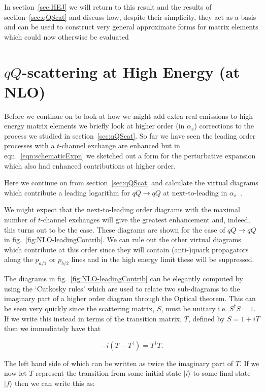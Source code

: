		In section~\ref{sec:HEJ} we will return to this result and the results of section~\ref{sec:qQScat} and discuss how,
		despite their simplicity, they act as a basis and can be used to construct very general approximate forms for matrix elements which
		could now otherwise be evaluated

\section{$qQ$-scattering at High Energy (at NLO)}
	\label{sub:HE22_NLO}

	Before we continue on to look at how we might add extra real emissions to high energy matrix
	elements we briefly look at higher order (in $\alpha_s$) corrections to the process we studied in
	section~\ref{sec:qQScat}.  So far we have seen the leading order processes with a $t$-channel
	exchange are enhanced but in eqn.~\eqref{eqn:schematicExpn} we sketched out a form for
	the perturbative expansion which also had enhanced contributions at higher order.

	Here we continue on from section~\ref{sec:qQScat} and calculate the virtual diagrams which contribute
	a leading logarithm for $qQ\to qQ$ at next-to-leading in $\alpha_s$~\cite{sabioThesis,DelDuca:1995hf}.

	We might expect that the next-to-leading order diagrams with the maximal number of $t$-channel exchanges
	will give the greatest enhancement and, indeed, this turns out to be the case.  These diagrams are shown
	for the case of $qQ\rightarrow qQ$ in fig.~\eqref{fig:NLO-leadingContrib}.  We can rule out the other
	virtual diagrams which contribute at this order since they will contain (anti-)quark propagators along
	the $p_{a/1}$ or $p_{b/2}$ lines and in the high energy limit these will be suppressed.

	The diagrams in fig.~\eqref{fig:NLO-leadingContrib} can be elegantly computed by using the `Cutkosky
	rules' which are used to relate two sub-diagrams to the imaginary part of a higher order diagram through
	the Optical theorem.  This can be seen very quickly since the scattering matrix, $S$, must be unitary i.e.
	$S^\dagger S=1$.  If we write this instead in terms of the transition matrix, $T$, defined by $S=1+iT$
	then we immediately have that

	\begin{equation}
		-i(T - T^\dagger) = T^\dagger T.
	\end{equation}

	The left hand side of which can be written as twice the imaginary part of $T$.  If we now let
	$T$ represent the transition from some initial state $|i\rangle$ to some final state
	$|f\rangle$ then we can write this as:

